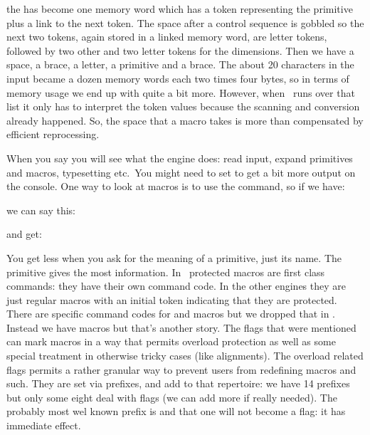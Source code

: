 \starttyping[option=TEX]
\stoptyping

the \type {\hbox} has become one memory word which has a token representing the
\type {\hbox} primitive plus a link to the next token. The space after a control
sequence is gobbled so the next two tokens, again stored in a linked memory word,
are letter tokens, followed by two other and two letter tokens for the
dimensions. Then we have a space, a brace, a letter, a primitive and a brace. The
about 20 characters in the input became a dozen memory words each two times four
bytes, so in terms of memory usage we end up with quite a bit more. However, when
\TEX\ runs over that list it only has to interpret the token values because the
scanning and conversion already happened. So, the space that a macro takes is
more than compensated by efficient reprocessing.

\stopsectionlevel

\startsectionlevel[title=Looking at tokens]

When you say \type {\tracingall} you will see what the engine does: read input,
expand primitives and macros, typesetting etc.\ You might need to set \type
{\tracingonline} to get a bit more output on the console. One way to look at
macros is to use the \type {\meaning} command, so if we have:

\startbuffer[definition]
\permanent\protected{}
\stopbuffer

\startbuffer[meaning]
\meaning    \MyMacro
\meaningless\MyMacro
\meaningfull\MyMacro
\stopbuffer

\typebuffer[definition][option=TEX]

we can say this:

\typebuffer[meaning][option=TEX]

and get:

{\getbuffer[definition]\startlines\tttf \getbuffer[meaning]\stoplines}

You get less when you ask for the meaning of a primitive, just its name. The
\type {\meaningfull} primitive gives the most information. In \LUAMETATEX\
protected macros are first class commands: they have their own command code. In
the other engines they are just regular macros with an initial token indicating
that they are protected. There are specific command codes for \type {\outer} and
\type {\long} macros but we dropped that in \LUAMETATEX . Instead we have \type
{\tolerant} macros but that's another story. The flags that were mentioned can
mark macros in a way that permits overload protection as well as some special
treatment in otherwise tricky cases (like alignments). The overload related flags
permits a rather granular way to prevent users from redefining macros and such.
They are set via prefixes, and add to that repertoire: we have 14 prefixes but
only some eight deal with flags (we can add more if really needed). The probably
most wel known prefix is \type {\global} and that one will not become a flag: it
has immediate effect.

